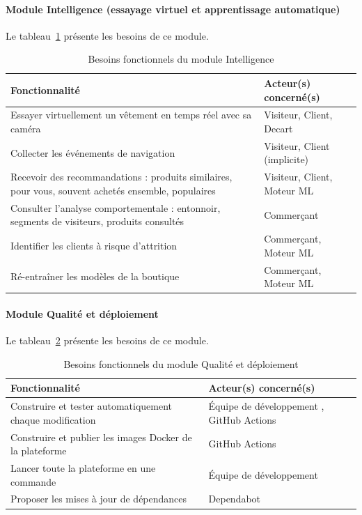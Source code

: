 \paragraph{Module Intelligence (essayage virtuel et apprentissage automatique)}
Le tableau~\ref{tab:besoins-ia} présente les besoins de ce module.
\begin{table}[H]
\centering
\renewcommand{\arraystretch}{1.3}
\begin{tabular}{|p{9.5cm}|p{5.5cm}|}
\hline
\textbf{Fonctionnalité} & \textbf{Acteur(s) concerné(s)} \\
\hline
Essayer virtuellement un vêtement en temps réel avec sa caméra & Visiteur, Client, Decart \\
\hline
Collecter les événements de navigation & Visiteur, Client (implicite) \\
\hline
Recevoir des recommandations : produits similaires, pour vous, souvent achetés ensemble, populaires & Visiteur, Client, Moteur ML \\
\hline
Consulter l'analyse comportementale : entonnoir, segments de visiteurs, produits consultés & Commerçant \\
\hline
Identifier les clients à risque d'attrition & Commerçant, Moteur ML \\
\hline
Ré-entraîner les modèles de la boutique & Commerçant, Moteur ML \\
\hline
\end{tabular}
\caption{Besoins fonctionnels du module Intelligence}
\label{tab:besoins-ia}
\end{table}

\paragraph{Module Qualité et déploiement}
Le tableau~\ref{tab:besoins-devops} présente les besoins de ce module.
\begin{table}[H]
\centering
\renewcommand{\arraystretch}{1.3}
\begin{tabular}{|p{9.5cm}|p{5.5cm}|}
\hline
\textbf{Fonctionnalité} & \textbf{Acteur(s) concerné(s)} \\
\hline
Construire et tester automatiquement chaque modification & Équipe de développement , GitHub Actions \\
\hline
Construire et publier les images Docker de la plateforme & GitHub Actions \\
\hline
Lancer toute la plateforme en une commande & Équipe de développement  \\
\hline
Proposer les mises à jour de dépendances & Dependabot \\
\hline
\end{tabular}
\caption{Besoins fonctionnels du module Qualité et déploiement}
\label{tab:besoins-devops}
\end{table}

